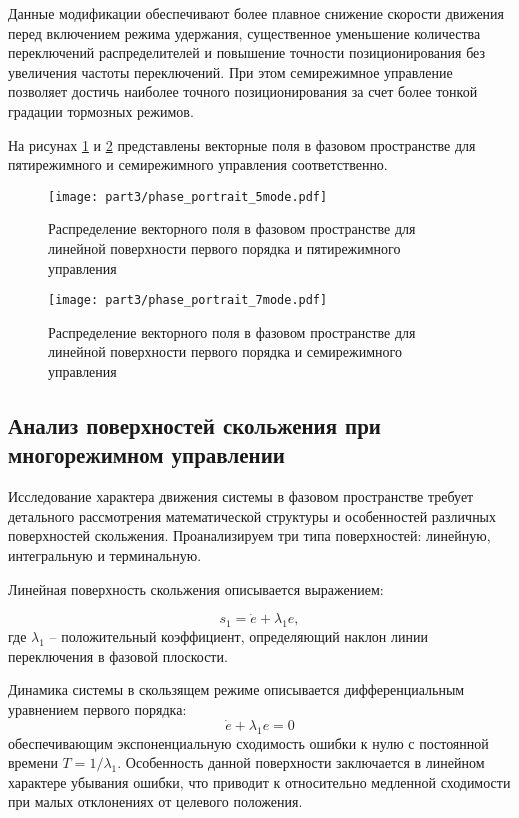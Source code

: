 Данные модификации обеспечивают более плавное снижение скорости движения перед включением режима удержания,
существенное уменьшение количества переключений распределителей и повышение точности позиционирования
без увеличения частоты переключений. При этом семирежимное управление позволяет достичь
наиболее точного позиционирования за счет более тонкой градации тормозных режимов.

На рисунах \ref{fig:vector_field_linear_5mode} и \ref{fig:vector_field_linear_7mode} представлены векторные поля 
в фазовом пространстве для пятирежимного и семирежимного управления соответственно.

\begin{figure}[htbp]
\centering
\texttt{[image: part3/phase\_portrait\_5mode.pdf]}
\caption{Распределение векторного поля в фазовом пространстве для линейной поверхности первого порядка и пятирежимного управления}
\label{fig:vector_field_linear_5mode}
\end{figure}

\begin{figure}[htbp]
\centering
\texttt{[image: part3/phase\_portrait\_7mode.pdf]}
\caption{Распределение векторного поля в фазовом пространстве для линейной поверхности первого порядка и семирежимного управления}
\label{fig:vector_field_linear_7mode}
\end{figure}

\subsection{Анализ поверхностей скольжения при многорежимном управлении}\label{subsec:ch3/sec3/sub3}

Исследование характера движения системы в фазовом пространстве требует детального рассмотрения математической
структуры и особенностей различных поверхностей скольжения.
Проанализируем три типа поверхностей: линейную, интегральную и терминальную.

Линейная поверхность скольжения описывается выражением:

$$
s_1 = \dot{e} + \lambda_1 e,
$$
где $\lambda_1$ -- положительный коэффициент, определяющий наклон линии переключения в
фазовой плоскости.

Динамика системы в скользящем режиме описывается дифференциальным уравнением первого порядка:
$$
\dot{e} + \lambda_1 e = 0
$$
обеспечивающим экспоненциальную сходимость ошибки к нулю с постоянной
времени $T = 1/\lambda_1$. Особенность данной поверхности заключается в
линейном характере убывания ошибки, что приводит к
относительно медленной сходимости при малых отклонениях от целевого положения.


